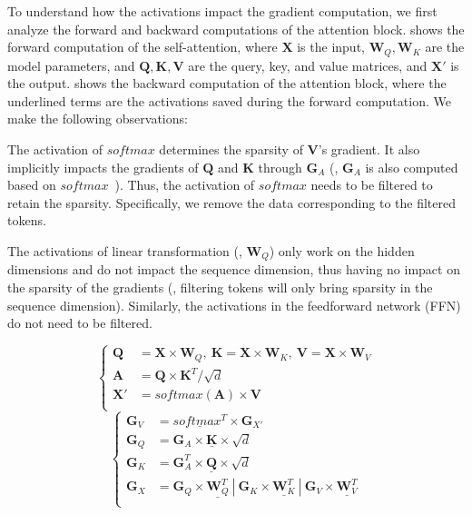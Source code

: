 To understand how the activations impact the gradient computation, we first analyze the forward and backward computations of the attention block.  shows the forward computation of the self-attention, where $\mathbf{X}$ is the input, $\mathbf{W}_Q, \mathbf{W}_K$ are the model parameters, and $\mathbf{Q, K, V}$ are the query, key, and value matrices, and $\mathbf{X'}$ is the output.  shows the backward computation of the attention block, where the underlined terms are the activations saved during the forward computation. We make the following observations:
\begin{icompact}
\item The activation of $softmax$ determines the sparsity of $\mathbf{V}$'s gradient. It also implicitly impacts the gradients of $\mathbf{Q}$ and $\mathbf{K}$ through $\mathbf{G}_A$ (\ie, $\mathbf{G}_A$ is also computed based on $softmax$~\cite{FlashAttention}). Thus, the activation of $softmax$ needs to be filtered to retain the sparsity. Specifically, we remove the data corresponding to the filtered tokens.
\item The activations of linear transformation (\eg, $\mathbf{W}_{Q}$) only work on the hidden dimensions and do not impact the sequence dimension, thus having no impact on the sparsity of the gradients (\ie, filtering tokens will only bring sparsity in the sequence dimension). Similarly, the activations in the feedforward network (FFN) do not need to be filtered.
\end{icompact}
\begin{equation} \label{eq:sys:attn_full_forward}
\left\{ 
\begin{aligned}
	\mathbf{Q} &= \mathbf{X} \times \mathbf{W}_Q,\ \mathbf{K} = \mathbf{X} \times \mathbf{W}_K,\ \mathbf{V} = \mathbf{X} \times \mathbf{W}_V\\
	\mathbf{A} &= \mathbf{Q}\times\mathbf{K}^T / \sqrt{d} \\
	\mathbf{X'} &= softmax(\mathbf{A}) \times \mathbf{V} \\
\end{aligned}
\right.
\end{equation}
\begin{equation} \label{eq:sys:attn_backward_activation}
\left\{ 
\begin{aligned}
	\mathbf{G}_V &= \underline{softmax^T} \times \mathbf{G}_{X'} \\
	\mathbf{G}_Q &= \mathbf{G}_A \times \underline{\mathbf{K}} \times \sqrt{d} \\
	\mathbf{G}_K &= \mathbf{G}_A^T \times \underline{\mathbf{Q}}  \times \sqrt{d} \\
	\mathbf{G}_{X} &= \mathbf{G}_Q \times \underline{\mathbf{W}_{Q}^T} \ | \ \mathbf{G}_K \times \underline{\mathbf{W}_{K}^T} \ | \ \mathbf{G}_V \times \underline{\mathbf{W}_{V}^T} \\
\end{aligned}
\right.
\end{equation}
